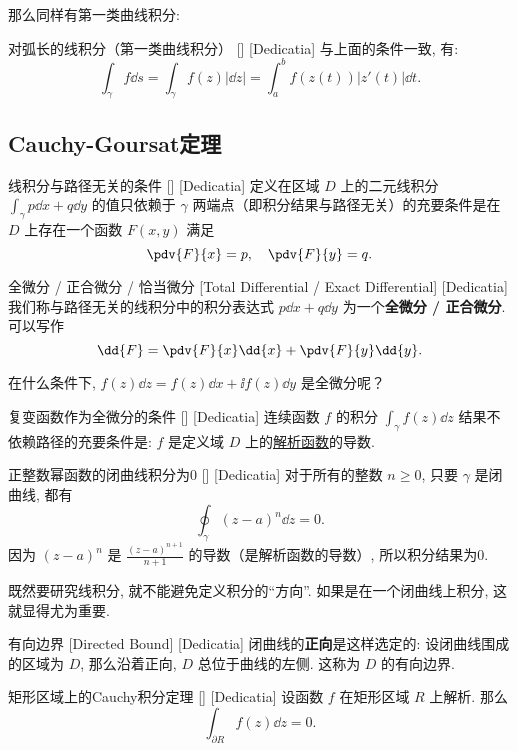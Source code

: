 \documentclass[UTF8]{ctexart}
\newcommand{\AnalyticalFunction}{\hyperref[dfn:AnalyticalFunction]{解析函数}}
\begin{document}
那么同样有第一类曲线积分: 
\begin{ppt}
    [UUID]
    {对弧长的线积分（第一类曲线积分）}
    []
    [Dedicatia]
    与上面的条件一致, 有: 
    \[\int_\gamma f\dd{s}=\int_\gamma f(z)|\dd{z}|=\int_{a}^b f(z(t))|z'(t)|\dd{t}.\]
\end{ppt}
\subsection{Cauchy-Goursat定理}
\begin{thm}
    [UUID]
    {线积分与路径无关的条件}
    []
    [Dedicatia]
    定义在区域 \( D \) 上的二元线积分 \( \int_\gamma p\dd{x}+q\dd{y} \) 的值只依赖于 \( \gamma \) 两端点（即积分结果与路径无关）的充要条件是在 \( D \) 上存在一个函数 \( F(x,y) \) 满足
    \[\pdv{F}{x}=p,\quad\pdv{F}{y}=q.\]
\end{thm}
\begin{dfn}
    [ExactDifferential]
    {全微分 / 正合微分 / 恰当微分}
    [Total Differential / Exact Differential]
    [Dedicatia]
    我们称与路径无关的线积分中的积分表达式 \( p\dd{x}+q\dd{y} \) 为一个\textbf{全微分 / 正合微分}. 可以写作
    \[\dd{F}=\pdv{F}{x}\dd{x}+\pdv{F}{y}\dd{y}.\]
\end{dfn}
在什么条件下,  \( f(z)\dd{z}=f(z)\dd{x}+\ii f(z)\dd{y} \) 是全微分呢？
\begin{crl}
    [UUID]
    {复变函数作为全微分的条件}
    []
    [Dedicatia]
    连续函数 \( f \) 的积分 \( \int_\gamma f(z)\dd{z} \) 结果不依赖路径的充要条件是:  \( f \) 是定义域 \( D \) 上的\AnalyticalFunction 的导数. 
\end{crl}
\begin{xmp}
    [UUID]
    {正整数幂函数的闭曲线积分为0}
    []
    [Dedicatia]
    对于所有的整数 \( n\geqslant 0 \), 只要 \( \gamma \) 是闭曲线, 都有
    \[\oint_\gamma (z-a)^n\dd{z}=0.\]
    因为 \( (z-a)^n \) 是 \( \frac{(z-a)^{n+1}}{n+1} \) 的导数（是解析函数的导数）, 所以积分结果为0. 
\end{xmp}
既然要研究线积分, 就不能避免定义积分的“方向”. 如果是在一个闭曲线上积分, 这就显得尤为重要. 
\begin{dfn}
    [UUID]
    {有向边界}
    [Directed Bound]
    [Dedicatia]
    闭曲线的\textbf{正向}是这样选定的: 设闭曲线围成的区域为 \( D \), 那么沿着正向,  \( D \) 总位于曲线的左侧. 这称为 \( D \) 的有向边界. 
\end{dfn}
\begin{thm}
    [UUID]
    {矩形区域上的Cauchy积分定理}
    []
    [Dedicatia]
    设函数 \( f \) 在矩形区域 \( R \) 上解析. 那么
    \[\int_{\partial R}f(z)\dd{z}=0.\]
\end{thm}
\end{document}
